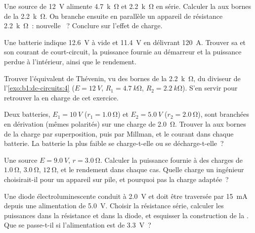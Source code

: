 \begin{exercise}[$\star$]\label{exo:b1:dc-circuits:4}
Une source de \qty{12}{V} alimente \qty{4.7}{k\ohm} et \qty{2.2}{k\ohm}
en série. Calculer la  aux bornes de la \qty{2.2}{k\ohm}. On
branche ensuite en parallèle un appareil de résistance \qty{2.2}{k\ohm}~:
nouvelle ~? Conclure sur l'effet de charge.
\end{exercise}

\begin{exercise}[$\star\star$]\label{exo:b1:dc-circuits:5}
Une batterie indique \qty{12.6}{V} à vide et \qty{11.4}{V} en délivrant
\qty{120}{A}. Trouver sa  et son courant de
court-circuit, la puissance fournie au démarreur et la puissance perdue
à l'intérieur, ainsi que le rendement.
\end{exercise}

\begin{exercise}[$\star\star$]\label{exo:b1:dc-circuits:6}
Trouver l'équivalent de Thévenin, vu des bornes de la \qty{2.2}{k\ohm},
du diviseur de l'\cref{exo:b1:dc-circuits:4}
($E = \qty{12}{V}$, $R_1 = \qty{4.7}{k\ohm}$, $R_2 = \qty{2.2}{k\ohm}$).
S'en servir pour retrouver la  en charge de cet exercice.
\end{exercise}

\begin{exercise}[$\star\star$]\label{exo:b1:dc-circuits:7}
Deux batteries, $E_1 = \qty{10}{V}$ ($r_1 = \qty{1.0}{\ohm}$) et
$E_2 = \qty{5.0}{V}$ ($r_2 = \qty{2.0}{\ohm}$), sont branchées en
dérivation (mêmes polarités) sur une charge de \qty{2.0}{\ohm}. Trouver
la  aux bornes de la charge par superposition, puis par Millman,
et le courant dans chaque batterie. La batterie la plus faible se
charge-t-elle ou se décharge-t-elle~?
\end{exercise}

\begin{exercise}[$\star\star$]\label{exo:b1:dc-circuits:8}
Une source $E = \qty{9.0}{V}$, $r = \qty{3.0}{\ohm}$. Calculer la
puissance fournie à des charges de $\qty{1.0}{\ohm}$, $\qty{3.0}{\ohm}$,
$\qty{12}{\ohm}$, et le rendement dans chaque cas. Quelle charge un
ingénieur choisirait-il pour un appareil sur pile, et pourquoi pas la
charge adaptée~?
\end{exercise}

\begin{exercise}[$\star\star$]\label{exo:b1:dc-circuits:9}
Une diode électroluminescente conduit à \qty{2.0}{V} et doit être
traversée par \qty{15}{mA} depuis une alimentation de \qty{5.0}{V}.
Choisir la résistance série, calculer les puissances dans la résistance
et dans la diode, et esquisser la construction de la .
Que se passe-t-il si l'alimentation est de \qty{3.3}{V}~?
\end{exercise}

